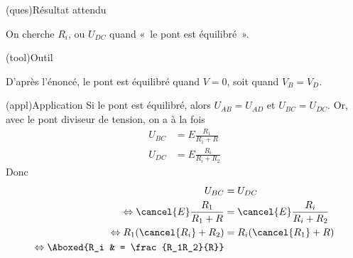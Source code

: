 \documentclass[../../main/main.tex]{subfiles}
\begin{document}
{\begin{tcbraster}[raster columns=6, raster equal height=rows]
\begin{tcb}[raster multicolumn=2]
\begin{center}
        \end{center}
    \end{tcb}
    \begin{tcolorbox}[blankest, raster multicolumn=1, space to=\myspace]
        \begin{tcbraster}[raster columns=1]
            \begin{tcb}[add to natural height=\myspace](ques){Résultat attendu}

                \fontsize{10pt}{12pt}\selectfont On cherche $R_i$, ou $U_{DC}$
                quand «~le pont est équilibré~».

            \end{tcb}
            \begin{tcb}(tool){Outil}

                \fontsize{10pt}{12pt}\selectfont D'après l'énoncé, le pont est
                équilibré quand $V = 0$, soit quand $V_B = V_D$.

            \end{tcb}
        \end{tcbraster}
    \end{tcolorbox}
    \begin{tcb}[raster multicolumn=3](appl){Application}
        Si le pont est équilibré, alors $U_{AB} = U_{AD}$ et $U_{BC} = U_{DC}$.
        Or, avec le pont diviseur de tension, on a à la fois
        \begin{align*}
            U_{BC} & = E \frac{R_1}{R_1+R}\\
            U_{DC} & = E \frac{R_i}{R_i+R_2}
        \end{align*}
        Donc
        \begin{align*}
            U_{BC} &= U_{DC}\\
            \Leftrightarrow \cancel{E} \frac{R_1}{R_1+R}
                   & = \cancel{E} \frac{R_i}{R_i+R_2}\\
            \Leftrightarrow R_1(\cancel{R_i}+R_2) & = R_i(\cancel{R_1}+R)\\
            \Leftrightarrow \Aboxed{R_i & = \frac{R_1R_2}{R}}
        \end{align*}
    \end{tcb}
\end{tcbraster}
}
\end{document}
